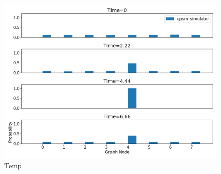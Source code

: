 \documentclass[../../dissertation.tex]{subfiles}
\begin{document}
\begin{figure}[!h]
	\centering
	\includegraphics[scale=0.40]{img/Qiskit/ContQuantumWalk/Search/ContQW_N3_S2.png}
	\caption{Temp}
	\label{fig:contSearchResultCircQistkit}
\end{figure}
\end{document}
